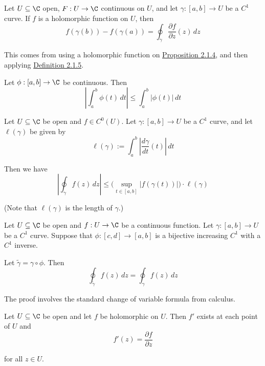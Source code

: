 \label{c526c09}

Let $U\subseteq\C$ open, $F:U\to\C$ continuous on $U$, and let $\gamma:[a,b]\to
U$ be a $C^1$ curve. If $f$ is a holomorphic function on $U$, then
$$
  f(\gamma(b))-f(\gamma(a))=\oint_\gamma\frac{\partial f}{\partial z}(z)\,dz
$$

This comes from using a holomorphic function on \href{f37b676}{Proposition
2.1.4}, and then applying \href{b1e96fc}{Definition 2.1.5}.

\label{bcec8b1}

Let $\phi:[a,b]\to\C$ be continuous. Then
$$
  \left|\int_a^b\phi(t)\,dt\right|\leq\int_a^b|\phi(t)|\,dt
$$

\label{faf3f86}

Let $U\subseteq\C$ be open and $f\in C^0(U)$. Let $\gamma:[a,b]\to U$ be a
$C^1$ curve, and let $\ell(\gamma)$ be given by
$$
  \ell(\gamma):=\int_a^b\left|\frac{d\gamma}{dt}(t)\right|\,dt
$$

Then we have
$$
  \left|\oint_\gamma f(z)\,dz\right|\leq
  \Big(\sup_{t\in[a,b]}|f(\gamma(t))|\Big)\cdot\ell(\gamma)
$$

(Note that $\ell(\gamma)$ is the length of $\gamma$.)

\label{f74efcb}

Let $U\subseteq\C$ be open and $f:U\to\C$ be a continuous function. Let
$\gamma:[a,b]\to U$ be a $C^1$ curve. Suppose that $\phi:[c,d]\to[a,b]$ is a
bijective increasing $C^1$ with a $C^1$ inverse.


Let $\tilde\gamma=\gamma\circ\phi$. Then
$$\oint_{\tilde\gamma}f(z)\,dz=\oint_\gamma f(z)\,dz$$

The proof involves the standard change of variable formula from calculus.

\label{f75e43c}

Let $U\subseteq\C$ be open and let $f$ be holomorphic on $U$. Then $f'$ exists
at each point of $U$ and
$$f'(z)=\frac{\partial f}{\partial z}$$

for all $z\in U$.

